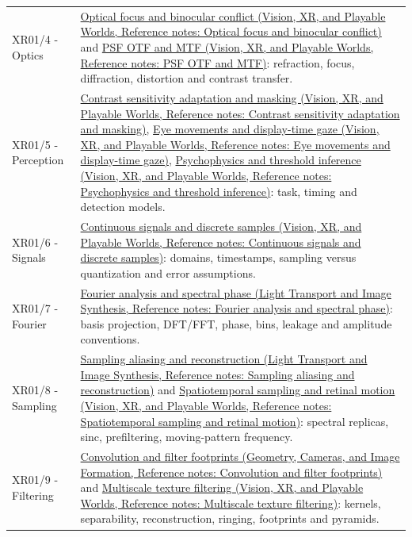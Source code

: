 {\begin{longtable}[]{@{}
  >{\raggedright\arraybackslash}p{}
  >{\raggedright\arraybackslash}p{}@{}}
XR01/4 - Optics & \href{../07-Vision-XR-and-Playable-Worlds/main.pdf\#nameddest=appendix-f90cee1be7a4}{Optical focus and binocular conflict (Vision, XR, and Playable Worlds, Reference notes: Optical focus and binocular conflict)} and \href{../07-Vision-XR-and-Playable-Worlds/main.pdf\#nameddest=appendix-8b76b0efd27f}{PSF OTF and MTF (Vision, XR, and Playable Worlds, Reference notes: PSF OTF and MTF)}: refraction, focus, diffraction, distortion and contrast transfer. \\
XR01/5 - Perception & \href{../07-Vision-XR-and-Playable-Worlds/main.pdf\#nameddest=appendix-b3aa9e8e01ad}{Contrast sensitivity adaptation and masking (Vision, XR, and Playable Worlds, Reference notes: Contrast sensitivity adaptation and masking)}, \href{../07-Vision-XR-and-Playable-Worlds/main.pdf\#nameddest=appendix-a6f2c4fe1996}{Eye movements and display-time gaze (Vision, XR, and Playable Worlds, Reference notes: Eye movements and display-time gaze)}, \href{../07-Vision-XR-and-Playable-Worlds/main.pdf\#nameddest=appendix-1759f03e8ce7}{Psychophysics and threshold inference (Vision, XR, and Playable Worlds, Reference notes: Psychophysics and threshold inference)}: task, timing and detection models. \\
XR01/6 - Signals & \href{../07-Vision-XR-and-Playable-Worlds/main.pdf\#nameddest=appendix-1077ea8fc737}{Continuous signals and discrete samples (Vision, XR, and Playable Worlds, Reference notes: Continuous signals and discrete samples)}: domains, timestamps, sampling versus quantization and error assumptions. \\
XR01/7 - Fourier & \href{../04-Light-Transport-and-Image-Synthesis/main.pdf\#nameddest=appendix-b60686ba06a1}{Fourier analysis and spectral phase (Light Transport and Image Synthesis, Reference notes: Fourier analysis and spectral phase)}: basis projection, DFT/FFT, phase, bins, leakage and amplitude conventions. \\
XR01/8 - Sampling & \href{../04-Light-Transport-and-Image-Synthesis/main.pdf\#nameddest=appendix-6a7869dd79a6}{Sampling aliasing and reconstruction (Light Transport and Image Synthesis, Reference notes: Sampling aliasing and reconstruction)} and \href{../07-Vision-XR-and-Playable-Worlds/main.pdf\#nameddest=appendix-70895739febb}{Spatiotemporal sampling and retinal motion (Vision, XR, and Playable Worlds, Reference notes: Spatiotemporal sampling and retinal motion)}: spectral replicas, sinc, prefiltering, moving-pattern frequency. \\
XR01/9 - Filtering & \href{../03-Geometry-Cameras-and-Image-Formation/main.pdf\#nameddest=appendix-d5b3c692d9f0}{Convolution and filter footprints (Geometry, Cameras, and Image Formation, Reference notes: Convolution and filter footprints)} and \href{../07-Vision-XR-and-Playable-Worlds/main.pdf\#nameddest=appendix-b677a85ba76f}{Multiscale texture filtering (Vision, XR, and Playable Worlds, Reference notes: Multiscale texture filtering)}: kernels, separability, reconstruction, ringing, footprints and pyramids. \\

\end{longtable}}
